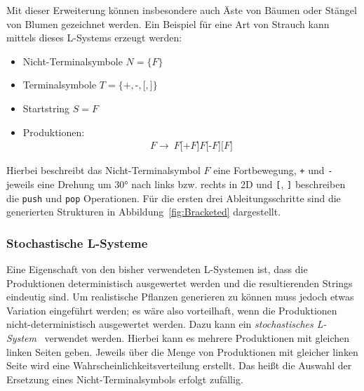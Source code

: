 Mit dieser Erweiterung können insbesondere auch Äste von Bäumen oder Stängel von Blumen gezeichnet werden.
Ein Beispiel für eine Art von Strauch kann mittels dieses L-Systems erzeugt werden:
\begin{itemize}
    \item Nicht-Terminalsymbole $N=\{F\}$
    \item Terminalsymbole $T=\{\texttt{+},\texttt{-},\texttt{[},\texttt{]}\}$
    \item Startstring $S=F$
    \item Produktionen:
    \begin{align*}
        F\rightarrow~F\texttt{[+}F\texttt{]}F\texttt{[-}F\texttt{]}\texttt{[}F\texttt{]}
    \end{align*}
\end{itemize}

Hierbei beschreibt das Nicht-Terminalsymbol $F$ eine Fortbewegung, \texttt{+} und \texttt{-} jeweils eine Drehung um \ang{30} nach links bzw. rechts in 2D und \texttt{[}, \texttt{]} beschreiben die \texttt{push} und \texttt{pop} Operationen.
Für die ersten drei Ableitungsschritte sind die generierten Strukturen in Abbildung~\ref{fig:Bracketed} dargestellt.

%        
%        
%        


\subsubsection{Stochastische L-Systeme}
Eine Eigenschaft von den bisher verwendeten L-Systemen ist, dass die Produktionen deterministisch ausgewertet werden und die resultierenden Strings eindeutig sind.
Um realistische Pflanzen generieren zu können muss jedoch etwas Variation eingeführt werden; es wäre also vorteilhaft, wenn die Produktionen nicht-deterministisch ausgewertet werden.
Dazu kann ein \emph{stochastisches L-System}~\cite*{Shaker2016} verwendet werden.
Hierbei kann es mehrere Produktionen mit gleichen linken Seiten geben.
Jeweils über die Menge von Produktionen mit gleicher linken Seite wird eine Wahrscheinlichkeitsverteilung erstellt.
Das heißt die Auswahl der Ersetzung eines Nicht-Terminalsymbols erfolgt zufällig.

